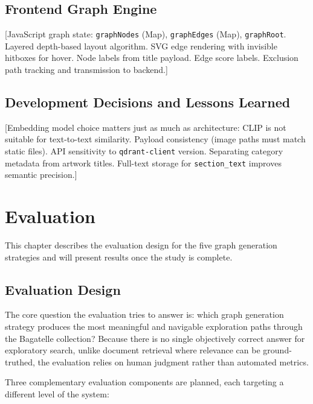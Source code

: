 \documentclass[12pt, a4paper]{article}
\begin{document}
\subsection{Frontend Graph Engine}

[JavaScript graph state: \texttt{graphNodes} (Map), \texttt{graphEdges} (Map),
\texttt{graphRoot}. Layered depth-based layout algorithm. SVG edge rendering with invisible
hitboxes for hover. Node labels from title payload. Edge score labels. Exclusion path tracking
and transmission to backend.]

\subsection{Development Decisions and Lessons Learned}

[Embedding model choice matters just as much as architecture: CLIP is not suitable for
text-to-text similarity. Payload consistency (image paths must match static files). API sensitivity
to \texttt{qdrant-client} version. Separating category metadata from artwork titles. Full-text
storage for \texttt{section\_text} improves semantic precision.]

\section{Evaluation}

This chapter describes the evaluation design for the five graph generation strategies and will
present results once the study is complete.

\subsection{Evaluation Design}

The core question the evaluation tries to answer is: which graph generation strategy produces
the most meaningful and navigable exploration paths through the Bagatelle collection? Because
there is no single objectively correct answer for exploratory search, unlike document retrieval
where relevance can be ground-truthed, the evaluation relies on human judgment rather than
automated metrics.

Three complementary evaluation components are planned, each targeting a different level of
the system:
\end{document}
